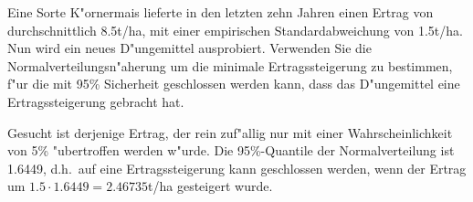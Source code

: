 Eine Sorte K"ornermais lieferte in den letzten zehn Jahren
einen Ertrag von durchschnittlich
8.5t/ha, mit einer empirischen Standardabweichung von 1.5t/ha.
Nun wird ein neues D"ungemittel ausprobiert.
Verwenden Sie die Normalverteilungsn"aherung um die minimale
Ertragssteigerung zu bestimmen, f"ur die mit 95\% Sicherheit geschlossen
werden kann, dass das D"ungemittel eine Ertragssteigerung gebracht hat.

\begin{loesung}
Gesucht ist derjenige Ertrag, der rein zuf"allig nur mit einer
Wahrscheinlichkeit
von 5\% "ubertroffen werden w"urde.
Die 95\%-Quantile der
Normalverteilung ist 1.6449, d.h.~auf eine Ertragssteigerung kann
geschlossen werden, wenn der Ertrag um
$1.5\cdot 1.6449=2.46735$t/ha gesteigert wurde.
\end{loesung}

